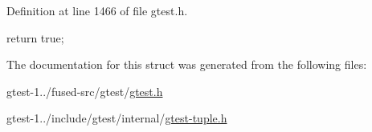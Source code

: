 \-Definition at line 1466 of file gtest.\-h.


\begin{DoxyCode}
                                                   {
    return true;
  }
\end{DoxyCode}


\-The documentation for this struct was generated from the following files\-:\begin{DoxyCompactItemize}
\item 
gtest-\/1../fused-\/src/gtest/\hyperlink{fused-src_2gtest_2gtest_8h}{gtest.\-h}\item 
gtest-\/1../include/gtest/internal/\hyperlink{gtest-tuple_8h}{gtest-\/tuple.\-h}\end{DoxyCompactItemize}
